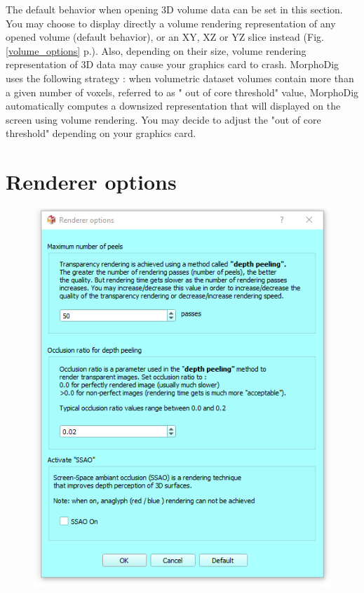 The default behavior when opening 3D volume data can be set in this section. You may choose to display directly a volume rendering representation of any opened volume (default behavior), or an XY, XZ or YZ slice instead (Fig. \ref{volume_options} p.\pageref{volume_options}). Also, depending on their size, volume rendering representation of 3D data may cause your graphics card to crash. MorphoDig uses the following strategy : when volumetric dataset volumes contain more than a given number of voxels, referred to as " out of core threshold" value, MorphoDig automatically computes a downsized representation that will displayed on the screen using volume rendering. You may decide to adjust the "out of core threshold" depending on your graphics card. 

\section{Renderer options}
\begin{figure}
  \centering  
 \includegraphics[scale=0.5]{images/08/renderer_options.png}
\label{renderer_options}
\end{figure}

